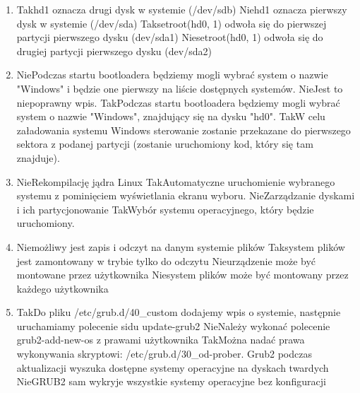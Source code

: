 \begin{enumerate}
	\item {}
	{Tak}{hd1 oznacza drugi dysk w systemie (/dev/sdb)}
	{Nie}{hd1 oznacza pierwszy dysk w systemie (/dev/sda)}
	{Tak}{setroot(hd0, 1) odwoła się do pierwszej partycji pierwszego dysku (dev/sda1)}
	{Nie}{setroot(hd0, 1) odwoła się do drugiej partycji pierwszego dysku (dev/sda2)}
	
	\item {}
	{Nie}{Podczas startu bootloadera będziemy mogli wybrać system o nazwie "Windows" i będzie one pierwszy na liście dostępnych systemów.}
	{Nie}{Jest to niepoprawny wpis.}
	{Tak}{Podczas startu bootloadera będziemy mogli wybrać system o nazwie "Windows", znajdujący się na dysku "hd0".}
	{Tak}{W celu załadowania systemu Windows sterowanie zostanie przekazane do pierwszego sektora z podanej partycji (zostanie uruchomiony kod, który się tam znajduje).}

	\item {}
	{Nie}{Rekompilację jądra Linux}
	{Tak}{Automatyczne uruchomienie wybranego systemu z pominięciem wyświetlania ekranu wyboru.}
	{Nie}{Zarządzanie dyskami i ich partycjonowanie}
	{Tak}{Wybór systemu operacyjnego, który będzie uruchomiony.}

	\item {}
	{Nie}{możliwy jest zapis i odczyt na danym systemie plików}
	{Tak}{system plików jest zamontowany w trybie tylko do odczytu}
	{Nie}{urządzenie może być montowane przez użytkownika}
	{Nie}{system plików może być montowany przez każdego użytkownika}
	
	\item {}
	{Tak}{Do pliku /etc/grub.d/40\_custom dodajemy wpis o systemie, następnie uruchamiamy polecenie sidu update-grub2}
	{Nie}{Należy wykonać polecenie grub2-add-new-os z prawami użytkownika}
	{Tak}{Można nadać prawa wykonywania skryptowi: /etc/grub.d/30\_od-prober. Grub2 podczas aktualizacji wyszuka dostępne systemy operacyjne na dyskach twardych}
	{Nie}{GRUB2 sam wykryje wszystkie systemy operacyjne bez konfiguracji}
	

\end{enumerate}
